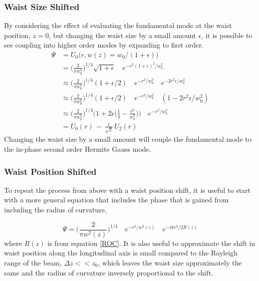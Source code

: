		\subsubsection{Waist Size Shifted}
		By considering the effect of evaluating the fundamental mode at the waist position, $z=0$, but changing the waist size by a small amount $\epsilon$, it is possible to see coupling into higher order modes by expanding to first order.	
		\begin{equation}
		\begin{aligned}
		\Psi 	&=  		U_{0} \big(r,w(z) = w_0/(1+\epsilon) \big) 
		\\		&= 			\bigg( \frac{2}{\pi w_0^2} \bigg)^{1/4} \sqrt{1 + \epsilon} \quad e^{-r^2 (1+\epsilon)^2/w_0^2 }
		\\		&\approx 	\bigg( \frac{2}{\pi w_0^2} \bigg)^{1/4} (1 + \epsilon /2) \quad e^{-r^2/w_0^2} \quad e^{-2r^2\epsilon/w_0^2} 
		\\		&\approx 	\bigg( \frac{2}{\pi w_0^2} \bigg)^{1/4} (1 + \epsilon /2) \quad e^{-r^2/w_0^2} \quad (1-2r^2\epsilon/w_0^2)
		\\		&\approx 	\bigg( \frac{2}{\pi w_0^2} \bigg)^{1/4} \bigg(1+ 2\epsilon\bigg(\frac{1}{4} - \frac{r^2}{w_0^2}\bigg) \bigg ) \quad e^{-r^2/w_0^2}	
		\\		&=			U_0(r) \, - \, \frac{\epsilon}{\sqrt{2}} \, U_2(r)
		\end{aligned}
		\end{equation}
		Changing the waist size by a small amount will couple the fundamental mode to the in-phase second order Hermite Gauss mode.
		
		\subsubsection{Waist Position Shifted}
		To repeat the process from above with a waist position shift, it is useful to start with a more general equation that includes the phase that is gained from including the radius of curvature,
		
		\begin{equation}\label{EFieldwPhase}
		\Psi = 	\bigg( \frac{2}{\pi w^2(z)} \bigg)^{1/4} \quad e^{-r^2/w^2(z)} \quad e^{-ikr^2/2R(z)}
		\end{equation}
		where $R(z)$ is from equation \ref{ROC}.  It is also useful to approximate the shift in waist position along the longitudinal axis is small compared to the Rayleigh range of the beam, $\Delta z << z_0$, which leaves the waist size approximately the same and the radius of curvature inversely proportional to the shift. 
		
